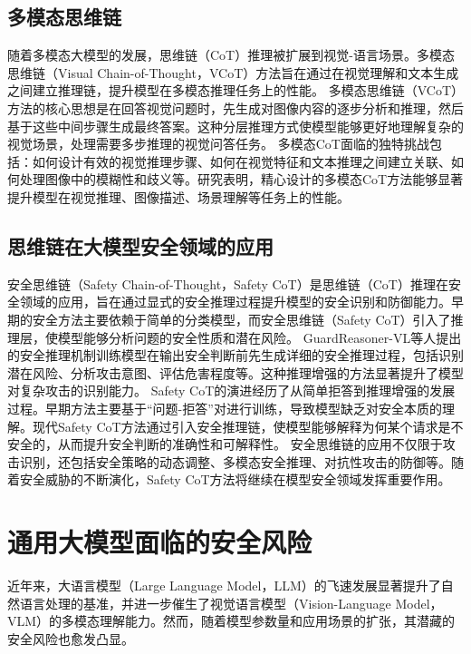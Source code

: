 \subsection{多模态思维链}
随着多模态大模型的发展，思维链（CoT）推理被扩展到视觉-语言场景。多模态思维链（Visual Chain-of-Thought，VCoT）方法旨在通过在视觉理解和文本生成之间建立推理链，提升模型在多模态推理任务上的性能。
多模态思维链（VCoT）方法的核心思想是在回答视觉问题时，先生成对图像内容的逐步分析和推理，然后基于这些中间步骤生成最终答案。这种分层推理方式使模型能够更好地理解复杂的视觉场景，处理需要多步推理的视觉问答任务。
多模态CoT面临的独特挑战包括：如何设计有效的视觉推理步骤、如何在视觉特征和文本推理之间建立关联、如何处理图像中的模糊性和歧义等。研究表明，精心设计的多模态CoT方法能够显著提升模型在视觉推理、图像描述、场景理解等任务上的性能\supercite{DBLP:conf/aaai/ChenZSHSGG24}。

\subsection{思维链在大模型安全领域的应用}
安全思维链（Safety Chain-of-Thought，Safety CoT）是思维链（CoT）推理在安全领域的应用，旨在通过显式的安全推理过程提升模型的安全识别和防御能力。早期的安全方法主要依赖于简单的分类模型，而安全思维链（Safety CoT）引入了推理层，使模型能够分析问题的安全性质和潜在风险。
GuardReasoner-VL等人提出的安全推理机制训练模型在输出安全判断前先生成详细的安全推理过程，包括识别潜在风险、分析攻击意图、评估危害程度等。这种推理增强的方法显著提升了模型对复杂攻击的识别能力\supercite{DBLP:journals/corr/abs-2505-18531}。
Safety CoT的演进经历了从简单拒答到推理增强的发展过程。早期方法主要基于“问题-拒答”对进行训练，导致模型缺乏对安全本质的理解。现代Safety CoT方法通过引入安全推理链，使模型能够解释为何某个请求是不安全的，从而提升安全判断的准确性和可解释性。
安全思维链的应用不仅限于攻击识别，还包括安全策略的动态调整、多模态安全推理、对抗性攻击的防御等。随着安全威胁的不断演化，Safety CoT方法将继续在模型安全领域发挥重要作用。

\section{通用大模型面临的安全风险}
近年来，大语言模型（Large Language Model，LLM）的飞速发展显著提升了自然语言处理的基准，并进一步催生了视觉语言模型（Vision-Language Model，VLM）的多模态理解能力\supercite{wang-adashield-eccv-2024, DBLP:journals/corr/abs-2505-24208}。然而，随着模型参数量和应用场景的扩张，其潜藏的安全风险也愈发凸显\supercite{DBLP:conf/cvpr/WangGL025}。

